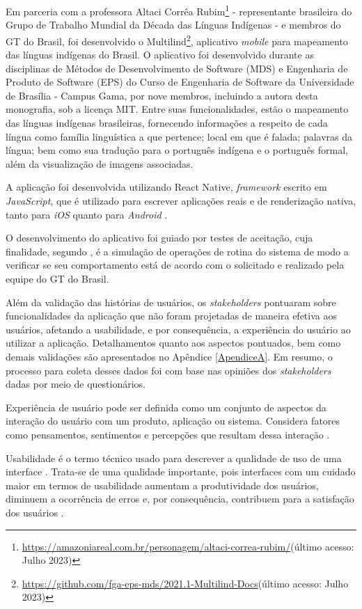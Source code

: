 Em parceria com a professora Altaci Corrêa Rubim\footnote{\url{https://amazoniareal.com.br/personagem/altaci-correa-rubim/}(último acesso: Julho 2023)} - representante
brasileira do Grupo de Trabalho Mundial da Década das Línguas Indígenas - e membros do GT do Brasil, foi desenvolvido o
Multilind\footnote{\url{https://github.com/fga-eps-mds/2021.1-Multilind-Docs}(último acesso: Julho 2023)}, aplicativo \textit{mobile} para mapeamento das línguas
indígenas do Brasil. O aplicativo foi desenvolvido durante as disciplinas de Métodos de Desenvolvimento de Software (MDS) e Engenharia de Produto de Software (EPS) do
Curso de Engenharia de Software da Universidade de Brasília - Campus Gama, por nove membros, incluindo a autora desta monografia, sob a licença MIT. Entre suas funcionalidades, estão o mapeamento das línguas
indígenas brasileiras, fornecendo informações a respeito de cada língua como família linguística a que pertence; local em que é falada; palavras da língua; bem como sua
tradução para o português indígena e o português formal, além da visualização de imagens associadas.

A aplicação foi desenvolvida utilizando React Native, \textit{framework} escrito em \textit{JavaScript}, que é utilizado para escrever aplicações reais e de
renderização nativa, tanto para \textit{iOS} quanto para \textit{Android} \cite{eiseman2017}.

O desenvolvimento do aplicativo foi guiado por testes de aceitação, cuja finalidade, segundo , é a simulação de operações de rotina do sistema de
modo a verificar se seu comportamento está de acordo com o solicitado e realizado pela equipe do GT do Brasil.

Além da validação das histórias de usuários, os \textit{stakeholders} pontuaram sobre funcionalidades da aplicação que não foram projetadas de maneira efetiva aos
usuários, afetando a usabilidade, e por consequência, a experiência do usuário ao utilizar a aplicação. Detalhamentos quanto aos aspectos pontuados, bem como demais validações 
são apresentados no Apêndice \ref{ApendiceA}. Em resumo, o processo para coleta desses dados foi com base nas opiniões dos \textit{stakeholders} dadas por meio de questionários.

Experiência de usuário pode ser definida como um conjunto de aspectos da interação do usuário com um produto, aplicação ou sistema. Considera fatores como pensamentos,
sentimentos e percepções que resultam dessa interação \cite{tulis2013}.

Usabilidade é o termo técnico usado para descrever a qualidade de uso de uma interface \cite{bevan1995}. Trata-se de uma qualidade importante, pois interfaces com um
cuidado maior em termos de usabilidade aumentam a produtividade dos usuários, diminuem a ocorrência de erros e, por consequência, contribuem para a satisfação dos
usuários \cite{winckler2022}.

